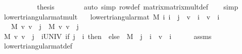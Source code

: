 \begin{isabellebody}
\isanewline
\ \ \ \ \isamarkupfalse%
\isanewline
\ \ \ \ \isamarkupfalse%
\ {\isacharquery}{\kern0pt}thesis\isanewline
\ \ \ \ \ \ \isamarkupfalse%
\ {\isacharparenleft}{\kern0pt}auto\ simp{\isacharcolon}{\kern0pt}\ row{\isacharunderscore}{\kern0pt}def\ matrix{\isacharunderscore}{\kern0pt}matrix{\isacharunderscore}{\kern0pt}mult{\isacharunderscore}{\kern0pt}def{\isacharparenright}{\kern0pt}\isanewline
\ \ \isamarkupfalse%
\isanewline
{}\isamarkupfalse%
\ simp%
\endisatagproof
{\isafoldproof}%
%
\isadelimproof
\isanewline
%
\endisadelimproof
\isanewline
{}\isamarkupfalse%
\ lower{\isacharunderscore}{\kern0pt}triangular{\isacharunderscore}{\kern0pt}mat{\isacharunderscore}{\kern0pt}mult{\isacharcolon}{\kern0pt}\isanewline
\ \ \ {\isachardoublequoteopen}lower{\isacharunderscore}{\kern0pt}triangular{\isacharunderscore}{\kern0pt}mat\ M{\isachardoublequoteclose}\ {\isachardoublequoteopen}{\isasymAnd}i{\isachardot}{\kern0pt}\ i\ {\isasymle}\ j\ {\isasymLongrightarrow}\ v\ {\isachardollar}{\kern0pt}\ i\ {\isacharequal}{\kern0pt}\ v{\isacharprime}{\kern0pt}\ {\isachardollar}{\kern0pt}\ i{\isachardoublequoteclose}\isanewline
\ \ \ {\isachardoublequoteopen}{\isacharparenleft}{\kern0pt}M\ {\isacharasterisk}{\kern0pt}v\ v{\isacharparenright}{\kern0pt}\ {\isachardollar}{\kern0pt}\ j\ {\isacharequal}{\kern0pt}\ {\isacharparenleft}{\kern0pt}M\ {\isacharasterisk}{\kern0pt}v\ v{\isacharprime}{\kern0pt}{\isacharparenright}{\kern0pt}\ {\isachardollar}{\kern0pt}\ j{\isachardoublequoteclose}\isanewline
%
\isadelimproof
%
\endisadelimproof
%
\isatagproof
{}\isamarkupfalse%
\ {\isacharminus}{\kern0pt}\isanewline
\ \ \isamarkupfalse%
\ {\isachardoublequoteopen}{\isacharparenleft}{\kern0pt}M\ {\isacharasterisk}{\kern0pt}v\ v{\isacharparenright}{\kern0pt}\ {\isachardollar}{\kern0pt}\ j\ {\isacharequal}{\kern0pt}\ {\isacharparenleft}{\kern0pt}{\isasymSum}i{\isasymin}UNIV{\isachardot}{\kern0pt}\ {\isacharparenleft}{\kern0pt}if\ j\ {\isacharless}{\kern0pt}\ i\ then\ {}\ else\ \ M\ {\isachardollar}{\kern0pt}\ j\ {\isachardollar}{\kern0pt}\ i\ {\isacharasterisk}{\kern0pt}\ v\ {\isachardollar}{\kern0pt}\ i{\isacharparenright}{\kern0pt}{\isacharparenright}{\kern0pt}{\isachardoublequoteclose}\isanewline
\ \ \ \ \isamarkupfalse%
\ assms\ \isamarkupfalse%
\ lower{\isacharunderscore}{\kern0pt}triangular{\isacharunderscore}{\kern0pt}mat{\isacharunderscore}{\kern0pt}def\isanewline

\end{isabellebody}
